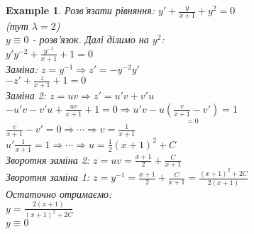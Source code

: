\documentclass[a4paper, 10pt]{article}
\theoremstyle{theoremdd}
\theoremstyle{theoremdd}
\theoremstyle{theoremdd}
\theoremstyle{theoremdd}
\newtheorem{example}[theorem]{Example}
\theoremstyle{theoremdd}
\theoremstyle{theoremdd}
\theoremstyle{theoremdd}
\theoremstyle{theoremdd}
\begin{document}
	\begin{example}
 Розв'язати рівняння: $\displaystyle y' + \frac{y}{x+1} + y^2 = 0$\\
	(тут $\lambda = 2$)\\
	$y \equiv 0$ - розв'язок. Далі ділимо на $y^2$:\\
	$\displaystyle y'y^{-2} + \frac{y^{-1}}{x+1} + 1 = 0$\\
	Заміна: $z = y^{-1} \Rightarrow z' = -y^{-2}y'$\\
	$\displaystyle -z' + \frac{z}{x+1} + 1 = 0$\\
	Заміна 2: $z = uv \Rightarrow z' = u'v+v'u$\\
	$\displaystyle -u'v - v'u + \frac{uv}{x+1} + 1 = 0 \Rightarrow u'v - u\underset{=0}{(\frac{v}{x+1}-v')} = 1$\\
	$\displaystyle \frac{v}{x+1} - v' = 0 \Rightarrow \cdots \Rightarrow v = \frac{1}{x+1}$\\
	$\displaystyle u'\frac{1}{x+1} = 1 \Rightarrow \cdots \Rightarrow u = \frac{1}{2}(x+1)^2 + C$\\
	Зворотня заміна 2: $\displaystyle z = uv = \frac{x+1}{2} + \frac{C}{x+1}$\\
	Зворотня заміна 1: $\displaystyle z = y^{-1} = \frac{x+1}{2} + \frac{C}{x+1} = \frac{(x+1)^2+2C}{2(x+1)}$\\
	Остаточно отримаємо:\\
	$\displaystyle y = \frac{2(x+1)}{(x+1)^2 + 2C}$\\
	$y \equiv 0$
	\end{example}

	
\end{document}
